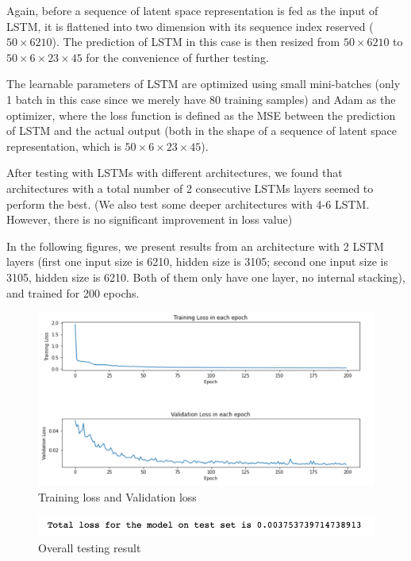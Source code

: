 Again, before a sequence of latent space representation is fed as the input of LSTM, it is flattened into two dimension with its sequence index reserved ($50 \times 6210$). The prediction of LSTM in this case is then resized from $50 \times 6210$ to $50 \times 6 \times 23 \times 45$ for the convenience of further testing.

The learnable parameters of LSTM are optimized using small mini-batches (only 1 batch in this case since we merely have 80 training samples) and Adam as the optimizer, where the loss function is defined as the MSE between the prediction of LSTM and the actual output (both in the shape of a sequence of latent space representation, which is $50 \times 6 \times 23 \times 45$).

After testing with LSTMs with different architectures, we found that architectures with a total number of 2 consecutive LSTMs layers seemed to perform the best. (We also test some deeper architectures with 4-6 LSTM. However, there is no significant improvement in loss value)

In the following figures, we present results from an architecture with 2 LSTM layers (first one input size is 6210, hidden size is 3105; second one input size is 3105, hidden size is 6210. Both of them only have one layer, no internal stacking), and trained for 200 epochs.

\begin{figure}[H]
    \caption{Training loss and Validation loss}
    \includegraphics[scale=0.6]{figures/mantle_convection_images/limited_dataset/LSTM_trainingData.png}
\end{figure}

\begin{figure}[H]
    \caption{Overall testing result}
    \includegraphics[scale=0.8]{figures/mantle_convection_images/limited_dataset/LSTM_OverallTesting.png}
\end{figure}

